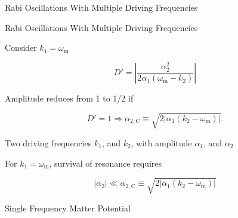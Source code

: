 \documentclass[9pt]{beamer}
\begin{document}
\begin{darkframes}
\begin{frame}{Rabi Oscillations With Multiple Driving Frequencies}
\end{frame}



\begin{frame}{Rabi Oscillations With Multiple Driving Frequencies}



Consider $k_1=\omega_{\mathrm m}$

\begin{equation*}
D' =  \left\vert \frac{\alpha_2^2}{2\alpha_1(\omega_{\mathrm m}-k_2)} \right\vert
\end{equation*}

Amplitude reduces from 1 to 1/2 if

\begin{equation*}
    D'=1 \Rightarrow \alpha_{2,\mathrm C} \equiv \sqrt{ 2 \lvert \alpha_1 (k_2 - \omega_{\mathrm m}) \rvert }.
\end{equation*}


\vspace{2em}

\begin{tcolorbox}
Two driving frequencies $k_1$, and $k_2$, with amplitude $\alpha_1$, and $\alpha_2$

For $k_1 = \omega_{\mathrm m}$, survival of resonance requires

\begin{equation*}
    \lvert \alpha_2\rvert \ll  \alpha_{2,\mathrm C}\equiv\sqrt{ 2 \lvert \alpha_1 (k_2 - \omega_{\mathrm m}) \rvert }
\end{equation*}

\end{tcolorbox}






\end{frame}









\begin{frame}{Single Frequency Matter Potential}


\end{frame}
\end{darkframes}
\end{document}
